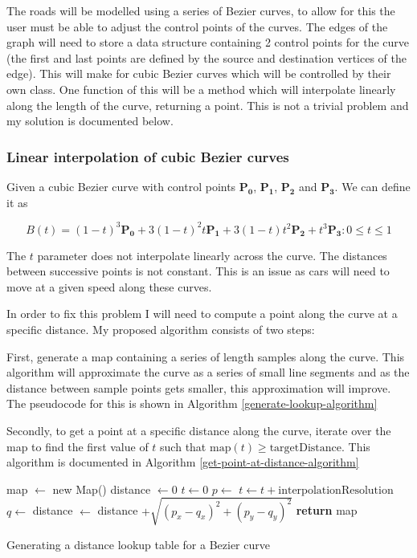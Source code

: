     The roads will be modelled using a series of Bezier curves, to allow for this the user must be able to adjust the control points of the curves. The edges of the graph will need to store a data structure containing 2 control points for the curve (the first and last points are defined by the source and destination vertices of the edge). This will make for cubic Bezier curves which will be controlled by their own  class. One function of this will be a  method which will interpolate linearly along the length of the curve, returning a point. This is not a trivial problem and my solution is documented below.

    \subsubsection{Linear interpolation of cubic Bezier curves}
    \label{design:linear-interpolation-bezier}

    Given a cubic Bezier curve with control points $\mathbf{P_0}$, $\mathbf{P_1}$, $\mathbf{P_2}$ and $\mathbf{P_3}$. We can define it as

    \[B(t) = (1 - t)^3\mathbf{P_0} + 3(1 - t)^2t\mathbf{P_1} + 3(1 - t)t^2\mathbf{P_2} + t^3\mathbf{P_3} : 0 \leq t \leq 1\]

    The $t$ parameter does not interpolate linearly across the curve. The distances between successive points is not constant. This is an issue as cars will need to move at a given speed along these curves.

    In order to fix this problem I will need to compute a point along the curve at a specific distance. My proposed algorithm consists of two steps:

    First, generate a map containing a series of length samples along the curve. This algorithm will approximate the curve as a series of small line segments and as the distance between sample points gets smaller, this approximation will improve. The pseudocode for this is shown in Algorithm \ref{generate-lookup-algorithm}

    Secondly, to get a point at a specific distance along the curve, iterate over the map to find the first value of $t$ such that $\text{map}(t) \geq \text{targetDistance}$. This algorithm is documented in Algorithm \ref{get-point-at-distance-algorithm}

    \begin{algorithm}
        \begin{algorithmic}
            \State map $\gets$ new Map()
            \State distance $\gets 0$
            \State $t \gets 0$
                \State {}
                \State $p \gets$ 
                \State $t \gets t + \text{interpolationResolution}$
                \State $q \gets$ 
                \State distance $\gets$ distance $+ \sqrt{(p_x - q_x)^2 + (p_y - q_y)^2}$
            \EndWhile
            \State \textbf{return} map
        \end{algorithmic}
        \caption{Generating a distance lookup table for a Bezier curve}
        \label{generate-lookup-algorithm}
    \end{algorithm}

